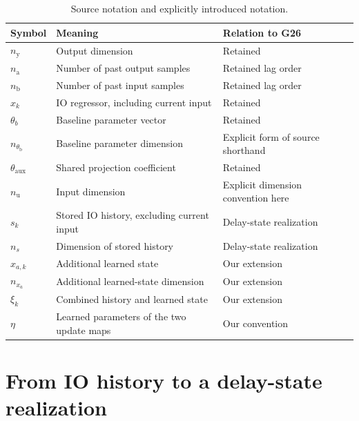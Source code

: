 \documentclass[11pt,a4paper]{article}
\begin{document}
\begin{table}[ht]
\centering\small
\begin{tabular}{lll}\toprule
Symbol & Meaning & Relation to G26\\\midrule
\(n_{\mathrm y}\) & Output dimension & Retained\\
\(n_{\mathrm a}\) & Number of past output samples & Retained lag order\\
\(n_{\mathrm b}\) & Number of past input samples & Retained lag order\\
\(x_k\) & IO regressor, including current input & Retained\\
\(\theta_b\) & Baseline parameter vector & Retained\\
\(n_{\theta_{\mathrm b}}\) & Baseline parameter dimension & Explicit form of source shorthand\\
\(\theta_{\mathrm{aux}}\) & Shared projection coefficient & Retained\\\midrule
\(n_{\mathrm u}\) & Input dimension & Explicit dimension convention here\\
\(s_k\) & Stored IO history, excluding current input & Delay-state realization\\
\(n_s\) & Dimension of stored history & Delay-state realization\\
\(x_{a,k}\) & Additional learned state & Our extension\\
\(n_{x_a}\) & Additional learned-state dimension & Our extension\\
\(\xi_k\) & Combined history and learned state & Our extension\\
\(\eta\) & Learned parameters of the two update maps & Our convention\\
\bottomrule\end{tabular}
\caption{Source notation and explicitly introduced notation.}\label{tab:notation}
\end{table}
\section{From IO history to a delay-state realization}
\end{document}

